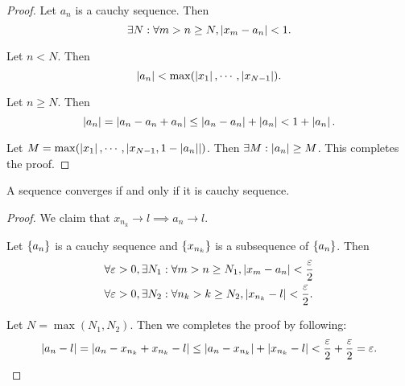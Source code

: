 \begin{proof}
  Let $a_n$ is a cauchy sequence. Then
  \begin{equation}
    \exists N: \forall m > n \ge N, \left| x_m - a_n \right| < 1.
  \end{equation}

  Let $n < N$. Then
  \begin{equation}
    \left| a_n \right| < \max (\left| x_1 \right|, \cdots, \left| x_{N-1} \right|).
  \end{equation}

  Let $n \ge N$. Then
  \begin{equation}
    \left| a_n \right|
    =   \left| a_n - a_n + a_n \right|
    \le \left| a_n - a_n \right| + \left| a_n \right|
    <   1 + \left| a_n \right|.
  \end{equation}

  Let $M = \max (\left| x_1 \right|, \cdots, \left| x_{N-1}, 1 - \left| a_n \right| \right|)$. Then
  $\exists M: \left| a_n \right| \ge M$. This completes the proof.
\end{proof}

\begin{theorem} 
  A sequence converges if and only if it is cauchy sequence.
  \label{thm:cauchy_test}
\end{theorem}

\begin{proof}

  We claim that $x_{n_k} \to l \implies a_n \to l$.

  Let $\{a_n\}$ is a cauchy sequence and $\{x_{n_k}\}$ is a subsequence of
  $\{a_n\}$. Then
  \begin{equation}
    \begin{split}
      &\forall \varepsilon > 0, \exists N_1: \forall m > n \ge N_1, \left| x_m - a_n \right|
      < \frac{\varepsilon}{2} \\
      &\forall \varepsilon > 0, \exists N_2: \forall n_k > k \ge N_2, \left| x_{n_k} - l \right|
      < \frac{\varepsilon}{2}.
    \end{split}
  \end{equation}

  Let $N = \max (N_1, N_2)$. Then we completes the proof by following:
  \begin{equation}
    \left| a_n - l \right|
    =   \left| a_n - x_{n_k} + x_{n_k} - l \right|
    \le \left| a_n - x_{n_k} \right| + \left| x_{n_k} - l \right|
    <   \frac{\varepsilon}{2} + \frac{\varepsilon}{2}
    =   \varepsilon.
  \end{equation}
\end{proof}

